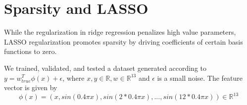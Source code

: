 \documentclass[10pt]{article}
\newcommand{\R}{\mathbb{R}}
\begin{document}






\section{Sparsity and LASSO}

While the regularization in ridge regression penalizes high value parameters, LASSO regularization promotes sparsity by driving coefficients of certain basis functions to zero.

We trained, validated, and tested a dataset generated according to $y=w_{true}^T\phi(x) + \epsilon$, where $x,y \in \R, w \in \R^{13}$ and $\epsilon$ is a small noise. The feature vector is given by
$$ \phi(x) = (x, sin(0.4\pi x), sin(2*0.4\pi x),...,sin(12*0.4\pi x)) \in \R^{13}$$
\end{document}
